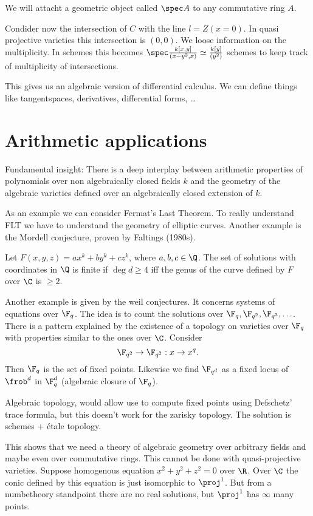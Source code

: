 We will attacht a geometric object called $\spec A$ to any commutative ring  $A$.


Condider now the intersection of  $C$ with the line $l = Z(x = 0)$.
In quasi projective varieties this intersection is  $(0,0)$. We loose information on the multiplicity. 
In schemes this becomes  $\spec \frac{k[x,y]}{(x - y^2, x)} \simeq \frac{k[y]}{(y^2)}$
schemes to keep track of multiplicity of intersections. 

This gives us an algebraic version of differential calculus. We can define things like tangentspaces, derivatives, differential forms, \ldots

\section{Arithmetic applications} \label{sec:arithmetic_applications}
Fundamental insight: There is a deep interplay between arithmetic properties of polynomials over non algebraically closed fields $k$ and the geometry of the algebraic varieties defined over an algebraically closed extension of $k$.

As an example we can consider Fermat's Last Theorem. To really understand FLT we have to understand the geometry of elliptic curves.  Another example is the Mordell conjecture, proven by Faltings (1980s).

\begin{theorem}
	[Mordell]
	Let $F(x,y,z) = a x^{k} + b y^{k} + c z^{k}$, where $a, b, c \in \Q$. 
	The set of solutions with coordinates in $\Q$ is finite if $\deg d \ge 4$ iff the genus of the curve defined by $F$ over $\C$ is $\ge 2$. 
\end{theorem}

Another example is given by the weil conjectures. It concerns systems of equations over $\F_q$. The idea is to count the solutions over  $\F_q, \F_{q^2}, \F_{q^3}, \ldots$. There is a pattern explained by the existence of a topology on varieties over $\F_q$ with properties similar to the ones over $\C$.  Consider
\[
\F_{q^2} \to \F_{q^2}: x \to x^{q}
.\] 
Then $\F_q$ is the set of fixed points. 
Likewise we find  $\F_{q^{d}}$ as a fixed locus of $\frob^{d}$ in $\F_q^{d}$ (algebraic closure of $\F_q$). 

Algebraic topology, would allow use to compute fixed points using Defschetz' trace formula, but this doesn't work for the zarisky topology. 
The solution is schemes + \'etale  topology.

This shows that we need a theory of algebraic geometry over arbitrary fields and maybe even over commutative rings. This cannot be done with quasi-projective varieties.
Suppose homogenous equation  $x^2 + y^2 + z^2 = 0$ over $\R$.
Over $\C$ the conic defined by this equation is just isomorphic to $\proj^1$.
But from a numbetheory standpoint there are no real solutions, but $\proj^1$ has $\infty$ many points. 

